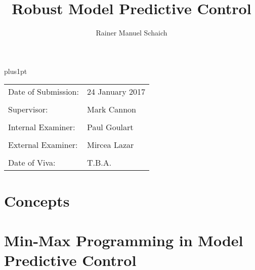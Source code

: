 \documentclass[12pt]{ociamthesis}  %
\title{Robust Model Predictive Control}   %
\author{Rainer Manuel Schaich}             %
\newcounter{mysection}
\renewcommand{\theequation}{\thesection.\arabic{equation}}
\renewcommand{\themysection}{\thesection.\arabic{mysection}}
\theoremstyle{remark}
\theoremstyle{definition}
\begin{document}


\baselineskip=18pt plus1pt

\setcounter{secnumdepth}{3}
\setcounter{tocdepth}{3}

\maketitle    

{
\thispagestyle{empty}
\null\vspace{39em}
\begin{tabular}{ll}
Date of Submission:& 24 January 2017\\
& \\
Supervisor:& Mark Cannon\\
& \\
Internal Examiner:& Paul Goulart\\
& \\
External Examiner:& Mircea Lazar\\
& \\
Date of Viva:& T.B.A.
\end{tabular}
}

\begin{romanpages}          %
\begin{abstract}

\end{abstract}



\tableofcontents            %
\newpage
\listoffigures              %
\newpage
\listofexamplecount
\printnoidxglossary[type=symbolslist,sort=def]
\end{romanpages}            %



\doublespace

\part{Concepts}


\part{Min-Max Programming in Model Predictive Control}



\renewcommand{\theequation}{\thechapter.\arabic{equation}}
\renewcommand{\themysection}{\thechapter.\arabic{mysection}}




\end{document}
